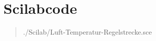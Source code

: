 

\section{Scilabcode}
\begin{quote}
    
        {./Scilab/Luft-Temperatur-Regelstrecke.sce}


\end{quote} %












